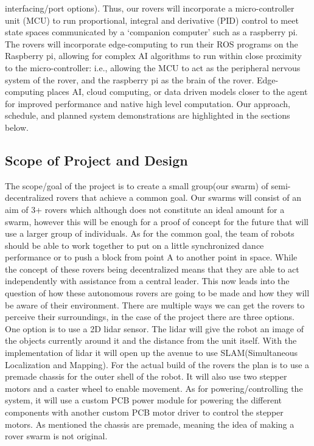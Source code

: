 \documentclass[conference]{IEEEtran}
\begin{document}
interfacing/port options). Thus, our rovers will incorporate a micro-controller unit (MCU) to run proportional, integral and derivative (PID) control to meet state spaces communicated by a ‘companion computer’ such as a raspberry pi. The rovers will incorporate edge-computing to run their ROS programs on the Raspberry pi, allowing for complex AI algorithms to run within close proximity to the micro-controller: i.e., allowing the MCU to act as the peripheral nervous system of the rover, and the raspberry pi as the brain of the rover. Edge-computing places AI, cloud computing, or data driven models closer to the agent for improved performance and native high level computation. Our approach, schedule, and planned system demonstrations are highlighted in the sections below.


\subsection{Scope of Project and Design}The scope/goal of the project is to create a small group(our swarm) of semi-decentralized rovers that achieve a common goal. Our swarms will consist of an aim of 3+ rovers which although does not constitute an ideal amount for a swarm, however this will be enough for a proof of concept for the future that will use a larger group of individuals. As for the common goal, the team of robots should be able to work together to put on a little synchronized dance performance or to push a block from point A to another point in space. While the concept of these rovers being decentralized means that they are able to act independently with assistance from a central leader. This now leads into the question of how these autonomous rovers are going to be made and how they will be aware of their environment.
There are multiple ways we can get the rovers to perceive their surroundings, in the case of the project there are three options. One option is to use a 2D lidar sensor. The lidar will give the robot an image of the objects currently around it and the distance from the unit itself. With the implementation of lidar it will open up the avenue to use SLAM(Simultaneous Localization and Mapping). For the actual build of the rovers the plan is to use a premade chassis for the outer shell of the robot. It will also use two stepper motors and a caster wheel to enable movement. As for powering/controlling the system, it will use a custom PCB power module for powering the different components with another custom PCB motor driver to control the stepper motors. As mentioned the chassis are premade, meaning the idea of making a rover swarm is not original.
\end{document}
